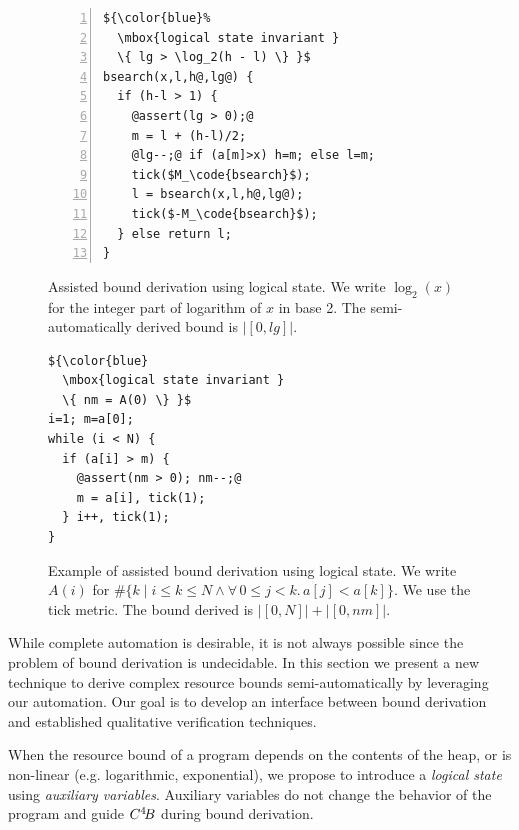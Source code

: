 \documentclass[nocopyrightspace,preprint,pldi]{sigplanconf-pldi15}
\begin{document}
\begin{figure}
\vspace{-.3cm}
\begin{lstlisting}[numbers=left]
${\color{blue}%
  \mbox{logical state invariant }
  \{ lg > \log_2(h - l) \} }$
bsearch(x,l,h@,lg@) {
  if (h-l > 1) {
    @assert(lg > 0);@
    m = l + (h-l)/2;
    @lg--;@ if (a[m]>x) h=m; else l=m;
    tick($M_\code{bsearch}$);
    l = bsearch(x,l,h@,lg@);
    tick($-M_\code{bsearch}$);
  } else return l;
}
\end{lstlisting}
\vspace{-.2cm}
\caption{Assisted bound derivation using logical state.
  We write $\log_2(x)$ for the integer part of
  logarithm of $x$ in base 2.
  The semi-automatically derived bound is $|[0,lg]|$.
  }
\label{fig:xmplbsaux}
\end{figure}

\ifdefined\fullversion
\begin{figure}
\begin{lstlisting}
${\color{blue}
  \mbox{logical state invariant }
  \{ nm = A(0) \} }$
i=1; m=a[0];
while (i < N) {
  if (a[i] > m) {
    @assert(nm > 0); nm--;@
    m = a[i], tick(1);
  } i++, tick(1);
}
\end{lstlisting}
\caption{Example of assisted bound derivation using logical state.
  We write $A(i)$ for
  $\#\{ k \mid i \le k \le N \land \forall\, 0\le j<k.\, a[j] < a[k]\}$.
  We use the tick metric.  The bound derived is $|[0,N]| + |[0,nm]|$.
  }
\label{fig:xmplmax}
\end{figure}
\fi

While complete automation is desirable, it is not always possible
since the problem of bound derivation is undecidable.  In this section
we present a new technique to derive complex resource bounds
semi-automatically by leveraging our automation. Our goal is to
develop an interface between bound derivation and
established qualitative verification techniques.

When the resource bound of a program depends on the contents of the
heap, or is non-linear (e.g. logarithmic, exponential), we propose to
introduce a \emph{logical state} using \emph{auxiliary variables}.
Auxiliary variables do not change the behavior of the program and
guide $C^4\!B$ during bound derivation.
\end{document}
